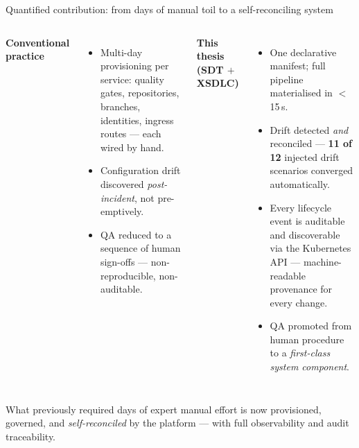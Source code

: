 \documentclass[11pt,aspectratio=169]{beamer}
\begin{document}
\begin{frame}{Quantified contribution: from days of manual toil to a self-reconciling system}

\begin{columns}[T,onlytextwidth]

\textbf{\textcolor{sdtred}{Conventional practice}}\\[0.4em]
\footnotesize
\begin{itemize}\setlength\itemsep{0.25em}
\item Multi-day provisioning per service: quality gates, repositories, branches, identities, ingress routes --- each wired by hand.
\item Configuration drift discovered \emph{post-incident}, not pre-emptively.
\item QA reduced to a sequence of human sign-offs --- non-reproducible, non-auditable.
\end{itemize}

\textbf{\textcolor{sdtgreen}{This thesis (SDT $+$ XSDLC)}}\\[0.4em]
\footnotesize
\begin{itemize}\setlength\itemsep{0.25em}
\item One declarative manifest; full pipeline materialised in $<$15\,s.
\item \alert{Drift detected \emph{and} reconciled} ---
  \textbf{11 of 12} injected drift scenarios converged automatically.
\item Every lifecycle event is \alert{auditable and discoverable} via the Kubernetes API --- machine-readable provenance for every change.
\item QA promoted from human procedure to a \emph{first-class system component}.
\end{itemize}

\end{columns}

\vspace{0.8em}
\begin{center}
\alert{What previously required days of expert manual effort is now provisioned, governed,
and \emph{self-reconciled} by the platform --- with full observability and audit traceability.}
\end{center}

\end{frame}
\end{document}
